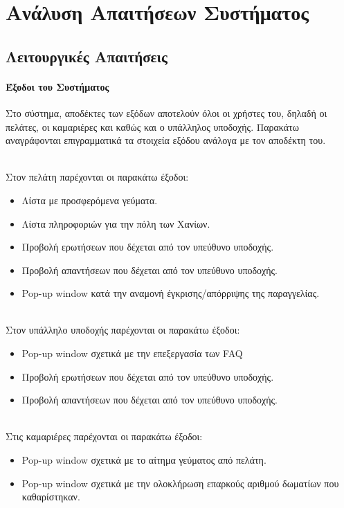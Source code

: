 \chapter{Ανάλυση Απαιτήσεων Συστήματος}

\section{Λειτουργικές Απαιτήσεις}
\subsubsection{Έξοδοι του Συστήματος}
Στο σύστημα, αποδέκτες των εξόδων αποτελούν όλοι οι χρήστες του, δηλαδή οι πελάτες, οι καμαριέρες 
και καθώς και ο υπάλληλος υποδοχής. Παρακάτω αναγράφονται επιγραμματικά τα στοιχεία εξόδου 
ανάλογα με τον αποδέκτη του. 

\noindent \\ 
Στον πελάτη παρέχονται οι παρακάτω έξοδοι:
\begin{itemize}
	\item  Λίστα με προσφερόμενα γεύματα.
	\item  Λίστα πληροφοριών για την πόλη των Χανίων.
	\item  Προβολή ερωτήσεων που δέχεται από τον υπεύθυνο υποδοχής.
	\item  Προβολή απαντήσεων  που δέχεται από τον υπεύθυνο υποδοχής.		
	\item  Pop-up window κατά την αναμονή έγκρισης/απόρριψης της παραγγελίας.
\end{itemize}

\noindent \\
Στον υπάλληλο υποδοχής παρέχονται οι παρακάτω έξοδοι:
\begin{itemize}
	\item  Pop-up window σχετικά με την επεξεργασία των FAQ
	\item Προβολή ερωτήσεων που δέχεται από τον υπεύθυνο υποδοχής.
	\item Προβολή απαντήσεων  που δέχεται από τον υπεύθυνο υποδοχής.	
\end{itemize}

\noindent \\ 
Στις καμαριέρες παρέχονται οι παρακάτω έξοδοι:
\begin{itemize}
	\item  Pop-up window σχετικά με το αίτημα γεύματος από πελάτη.
	\item  Pop-up window σχετικά με την ολοκλήρωση  επαρκούς αριθμού δωματίων που καθαρίστηκαν.
\end{itemize}

